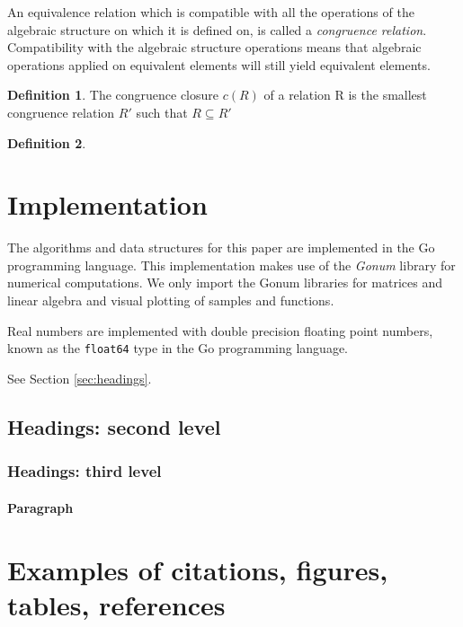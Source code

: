 \documentclass{article}
\theoremstyle{plain}%
\theoremstyle{definition}
\newtheorem{defn}{Definition}[section]
\theoremstyle{remark}
\begin{document}
An equivalence relation which is compatible with all the operations of
the algebraic structure on which it is defined on, is called a 
\textit{congruence relation}. Compatibility with the algebraic structure operations
means that algebraic operations applied on equivalent elements will still
yield equivalent elements. 


\begin{defn}
  The congruence closure $c(R)$ of a relation R is the smallest congruence relation 
  $R'$ such that $R \subseteq R'$ 
\end{defn}

\begin{defn}
  \textbf{} \\
  
\end{defn}

\section{Implementation}
\label{sec:impl}

The algorithms and data structures for this paper are implemented in the Go programming 
language. This implementation makes use of the \textit{Gonum} library for numerical 
computations. We only import the Gonum libraries for matrices and linear algebra 
and visual plotting of samples and functions.

Real numbers are implemented with double precision floating point numbers,  
known as the \texttt{float64} type in the Go programming language.


See Section \ref{sec:headings}.

\subsection{Headings: second level}


\subsubsection{Headings: third level}

\paragraph{Paragraph}

\section{Examples of citations, figures, tables, references}
\label{sec:others}
\end{document}
